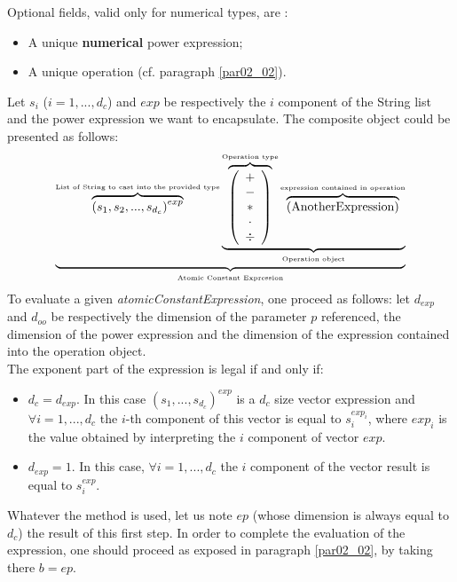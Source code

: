\documentclass[a4paper,11pt] {article}
\begin{document}
Optional fields, valid only for numerical types, are : 
\begin{itemize}
\item A unique {\bf numerical} power expression;
\item A unique operation (cf. paragraph \ref{par02_02}).
\end{itemize}

Let $s_i$ ($i=1,...,d_c$) and $exp$ be respectively the $i$ component of the String list and the power expression we want to encapsulate. The composite object could be presented as follows:
\begin{equation}
 \underbrace{    \overbrace{ \left( s_1  , s_2, ..., s_{d_c}\right)^{exp} }^{\mbox{\tiny List of String  to cast into the provided type}}   \underbrace{  \overbrace{\left( \begin{array}{c} + \\ - \\ \ast  \\ \cdot \\ \div   \end{array} \right) }^{\mbox{\tiny Operation type}}
 \overbrace{    \left( \mbox{AnotherExpression}\right) }^{\mbox{\tiny expression contained in operation}}   }_{\mbox{\tiny Operation object}}}_{\mbox{\tiny Atomic Constant Expression}}
\end{equation}
To evaluate a given {\it atomicConstantExpression}, one proceed as follows: let $d_{exp}$ and $d_{oo}$ be respectively the dimension of the parameter $p$ referenced, the dimension of the power expression and the dimension of the expression contained into the operation object.\\
The exponent part of the expression is legal if and only if:
\begin{itemize}
\item $d_c = d_{exp}$. In this case $(s_1,...,s_{d_c})^{exp}$ is a $d_c$ size vector expression and $\forall i =1,...,d_c$ the $i$-th component of this vector is equal to $s_i^{exp_i}$, where $exp_i$ is the value obtained by interpreting the $i$ component of vector $exp$.
\item $d_{exp}=1$. In this case, $\forall i =1,...,d_c$ the $i$ component of the vector result is equal to $s_i^{exp}$.\\
\end{itemize}
Whatever the method is used, let us note $ep$ (whose dimension is always equal to $d_c$) the result of 
this first step.  In order to complete the evaluation of the expression, one should proceed as exposed in paragraph \ref{par02_02}, by taking there $b=ep$.
\end{document}
